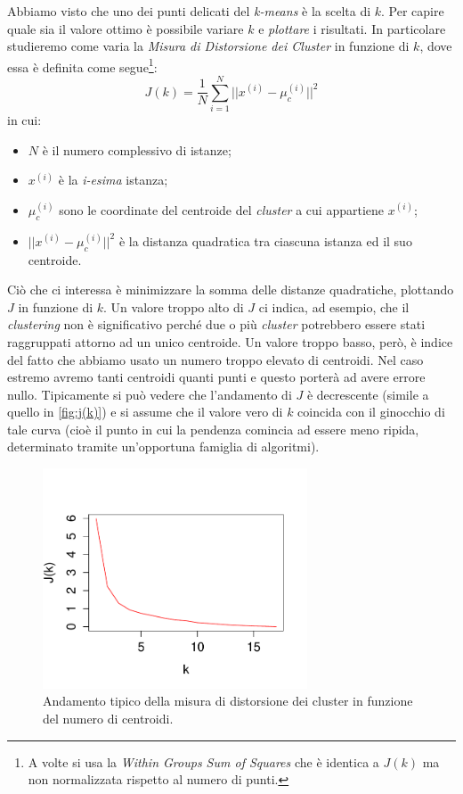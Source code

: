 Abbiamo visto che uno dei punti delicati del \emph{k-means} è la scelta di $k$. Per capire quale sia il valore ottimo è possibile variare $k$ e \emph{plottare} i risultati. In particolare studieremo come varia  la \emph{Misura di Distorsione dei Cluster} in funzione di $k$, dove essa è definita come segue\footnote{A volte si usa la  \emph{Within Groups Sum of Squares} che è identica a $J(k)$ ma non normalizzata rispetto al numero di punti.}:
\begin{equation*}
J(k) = \frac{1}{N} \sum_{i=1}^N || x^{(i)} - \mu_c^{(i)} ||^2
\end{equation*}
in cui:
\begin{itemize}
\item $N$ è il numero complessivo di istanze;
\item $ x^{(i)}$ è la \emph{i-esima} istanza;
\item $\mu_c^{(i)}$ sono le coordinate del centroide del \emph{cluster} a cui appartiene $ x^{(i)}$;
\item $|| x^{(i)} - \mu_c^{(i)} ||^2$ è la distanza quadratica tra ciascuna istanza ed il suo centroide.
\end{itemize}
Ciò che ci interessa è minimizzare la somma delle distanze quadratiche, plottando $J$ in funzione di $k$. Un valore troppo alto di $J$ ci indica, ad esempio, che il \emph{clustering} non è significativo perché due o più \emph{cluster} potrebbero essere stati raggruppati attorno ad un unico centroide. Un valore troppo basso, però, è indice del fatto che abbiamo usato un numero troppo elevato di centroidi. Nel caso estremo avremo tanti centroidi quanti punti e questo porterà ad avere errore nullo. Tipicamente si può vedere che l'andamento di $J$ è decrescente (simile a quello in \autoref{fig:j(k)}) e si assume che il valore vero di $k$ coincida con il ginocchio di tale curva (cioè il punto in cui la pendenza comincia ad essere meno ripida, determinato tramite un'opportuna famiglia di algoritmi).

\begin{figure}[tbp]
\centering
  \includegraphics[width=0.7\textwidth]{images/jk}
  \caption{Andamento tipico della misura di distorsione dei cluster in funzione del numero di centroidi.}
  \label{fig:j(k)}
\end{figure}


